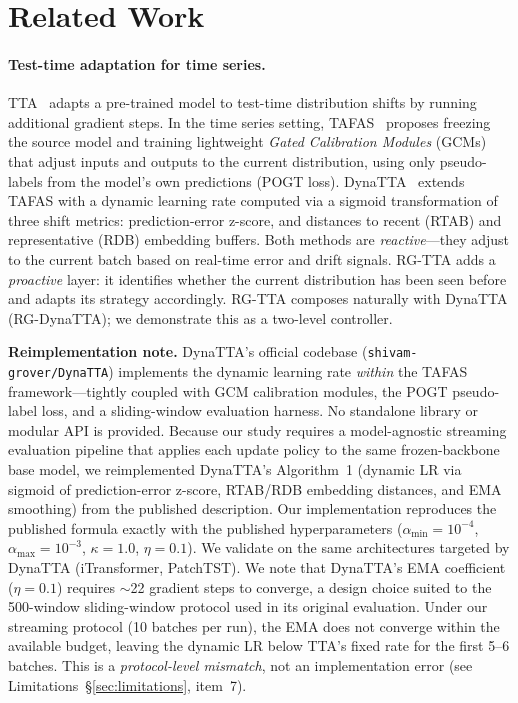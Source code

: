 \documentclass[journal]{IEEEtran}
\begin{document}
\section{Related Work}
\label{sec:related}

\paragraph{Test-time adaptation for time series.}
TTA~\cite{liang2024tta} adapts a pre-trained model to test-time distribution shifts by running additional gradient steps. In the time series setting, TAFAS~\cite{kim2025tafas} proposes freezing the source model and training lightweight \emph{Gated Calibration Modules} (GCMs) that adjust inputs and outputs to the current distribution, using only pseudo-labels from the model's own predictions (POGT loss). DynaTTA~\cite{grover2025dynatta} extends TAFAS with a dynamic learning rate computed via a sigmoid transformation of three shift metrics: prediction-error z-score, and distances to recent (RTAB) and representative (RDB) embedding buffers. Both methods are \emph{reactive}---they adjust to the current batch based on real-time error and drift signals. RG-TTA adds a \emph{proactive} layer: it identifies whether the current distribution has been seen before and adapts its strategy accordingly. RG-TTA composes naturally with DynaTTA (RG-DynaTTA); we demonstrate this as a two-level controller.

\textbf{Reimplementation note.} DynaTTA's official codebase (\texttt{shivam-grover/DynaTTA}) implements the dynamic learning rate \emph{within} the TAFAS framework---tightly coupled with GCM calibration modules, the POGT pseudo-label loss, and a sliding-window evaluation harness. No standalone library or modular API is provided. Because our study requires a model-agnostic streaming evaluation pipeline that applies each update policy to the same frozen-backbone base model, we reimplemented DynaTTA's Algorithm~1 (dynamic LR via sigmoid of prediction-error z-score, RTAB/RDB embedding distances, and EMA smoothing) from the published description. Our implementation reproduces the published formula exactly with the published hyperparameters ($\alpha_{\min}=10^{-4}$, $\alpha_{\max}=10^{-3}$, $\kappa=1.0$, $\eta=0.1$). We validate on the same architectures targeted by DynaTTA (iTransformer, PatchTST). We note that DynaTTA's EMA coefficient ($\eta=0.1$) requires $\sim$22 gradient steps to converge, a design choice suited to the 500-window sliding-window protocol used in its original evaluation. Under our streaming protocol (10 batches per run), the EMA does not converge within the available budget, leaving the dynamic LR below TTA's fixed rate for the first 5--6 batches. This is a \emph{protocol-level mismatch}, not an implementation error (see Limitations~\S\ref{sec:limitations}, item~7).
\end{document}
